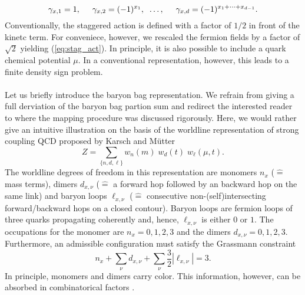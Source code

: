 \documentclass{PoS}
\begin{document}
\begin{equation}
\gamma_{x, 1} = 1, \hspace*{0.5cm}\gamma_{x, 2} = (-1)^{x_1},\;\; \dots, \hspace*{0.5cm}\gamma_{x, d} = (-1)^{x_1 + \dots + x_{d-1}}.
\end{equation}
Conventionally, the staggered action is defined with a factor of $1/2$ in front of the kinetc term. For conveniece, however, we rescaled the fermion fields by a factor of $\sqrt{2}$ yielding (\ref{eq:stag_act}). In principle, it is also possible to include a quark chemical potential $\mu$. In a conventional representation, however, this leads to a finite density sign problem.\\
\\
Let us briefly introduce the baryon bag representation. We refrain from giving a full derviation of the baryon bag partion sum and redirect the interested reader to \cite{Gattringer:2018mrg} where the mapping procedure was discussed rigorously. Here, we would rather give an intuitive illustration on the basis of the worldline representation of strong coupling QCD proposed by Karsch and M\"utter \cite{Karsch:1988zx}
\begin{equation}
Z = \sum_{\{n, d, \ell\}} w_n(m) \; w_d(t) \; w_{\ell}(\mu,t).
\end{equation}
The worldline degrees of freedom in this representation are monomers $n_x$ ($\hat{=}$ mass terms), dimers $d_{x,\nu}$ ($\hat{=}$ a forward hop followed by an backward hop on the same link) and baryon loops $\ell_{x,\nu}$ ($\hat{=}$ consecutive non-(self)intersecting forward/backward hops on a closed contour). Baryon loops are fermion loops of three quarks propagating coherently and, hence, $\ell_{x,\nu}$ is either $0$ or $1$. The occupations for the monomer are $n_x = 0,1,2,3$ and the dimers $d_{x,\nu} = 0,1,2,3$. Furthermore, an admissible configuration must satisfy the Grassmann constraint
\begin{equation}
n_x + \sum_{\nu} d_{x,\nu} + \sum_{\nu} \frac{3}{2} |\ell_{x,\nu}| = 3.
\label{eq:GM_const}
\end{equation}
In principle, monomers and dimers carry color. This information, however, can be absorbed in combinatorical factors \cite{Rossi:1984cv, Karsch:1988zx, Marchis:2018tcs}.\\
\\
\end{document}
